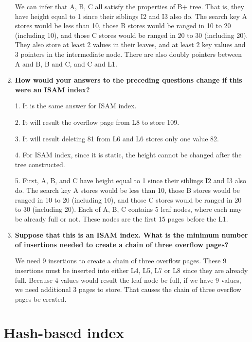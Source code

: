 \begin{enumerate}
We can infer that A, B, C all satisfy the properties of B+ tree.  That is, they have height equal to 1 since their siblings I2 and I3 also do.  The search key A stores would be less than 10, those B stores would be ranged in 10 to 20 (including 10), and those C stores would be ranged in 20 to 30 (including 20).  They also store at least 2 values in their leaves, and at least 2 key values and 3 pointers in the intermediate node.  There are also doubly pointers between A and B, B and C, and C and L1.

\item {\bf How would your answers to the preceding questions change if this were an ISAM index?}

1. It is the same answer for ISAM index.

2. It will result the overflow page from L8 to store 109.

3. It will result deleting 81 from L6 and L6 stores only one value 82.

4. For ISAM index, since it is static, the height cannot be changed after the tree constructed.

5. First, A, B, and C have height equal to 1 since their siblings I2 and I3 also do.  The search key A stores would be less than 10, those B stores would be ranged in 10 to 20 (including 10), and those C stores would be ranged in 20 to 30 (including 20).  Each of A, B, C contains 5 leaf nodes, where each may be already full or not.  These nodes are the first 15 pages before the L1.

\item {\bf Suppose that this is an ISAM index. What is the minimum number of insertions needed to create a chain of three overflow pages?}

We need 9 insertions to create a chain of three overflow pages.  These 9 insertions must be inserted into either L4, L5, L7 or L8 since they are already full.  Because 4 values would result the leaf node be full, if we have 9 values, we need additional 3 pages to store.  That causes the chain of three overflow pages be created.

\end{enumerate}

\section{Hash-based index}
